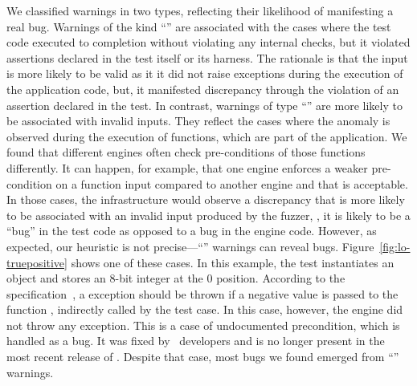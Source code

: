 \documentclass[10pt,conference,anonymous]{IEEEtran}
\begin{document}
We classified warnings in two types, reflecting their likelihood of
manifesting a real bug. Warnings of the kind ``\hi{}'' are associated
with the cases where the test code executed to completion without
violating any internal checks, but it violated assertions declared in
the test itself or its harness. The rationale is that the input is
more likely to be valid as it it did not raise exceptions during the
execution of the application code, but, it manifested discrepancy
through the violation of an assertion declared in the test. In
contrast, warnings of type ``\lo{}'' are more likely to be associated
with invalid inputs. They reflect the cases where the anomaly is
observed during the execution of functions, which are part of the
application. We found that different engines often check
pre-conditions of those functions differently. It can happen, for
example, that one engine enforces a weaker pre-condition on a function
input compared to another engine and that is acceptable. In those
cases, the infrastructure would observe a discrepancy that is more
likely to be associated with an invalid input produced by the fuzzer,
\ie{}, it is likely to be a ``bug'' in the test code as opposed to a
bug in the engine code. However, as expected, our heuristic is not
precise---``\lo'' warnings can reveal
bugs. Figure~\ref{fig:lo-truepositive} shows one of these cases. In
this example, the test instantiates an  object and
stores an 8-bit integer at the 0 position. According to the
specification~\cite{ecmas262-getviewvalue}, a 
exception should be thrown if a negative value is passed to the
function , indirectly called by the test case. In this
case, however, the \chakra{} engine did not throw any exception. This
is a case of undocumented precondition, which is handled as a bug. It
was fixed by \chakra\ developers and is no longer present in the most
recent release of \chakra. Despite that case, most bugs we found
emerged from ``\hi{}'' warnings.

\end{document}
